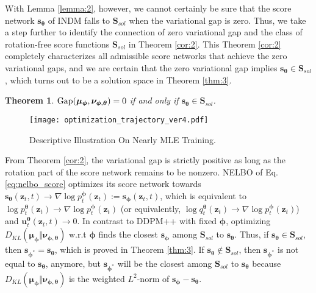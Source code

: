 \documentclass{article}
\newtheorem{theorem}{Theorem}\newtheorem{proposition}{Proposition}
\theoremstyle{definition}
\theoremstyle{remark}
\begin{document}
	With Lemma \ref{lemma:2}, however, we cannot certainly be sure that the score network $\mathbf{s}_{\bm{\theta}}$ of INDM falls to $\mathbf{S}_{sol}$ when the variational gap is zero. Thus, we take a step further to identify the connection of zero variational gap and the class of rotation-free score functions $\mathbf{S}_{sol}$ in Theorem \ref{cor:2}. This Theorem \ref{cor:2} completely characterizes all admissible score networks that achieve the zero variational gaps, and we are certain that the zero variational gap implies $\mathbf{s}_{\bm{\theta}}\in\mathbf{S}_{sol}$, which turns out to be a solution space in Theorem \ref{thm:3}.
	\begingroup
	\renewcommand\thetheorem{2}
	\begin{theorem}
		$\textup{Gap}(\bm{\mu}_{\bm{\phi}},\bm{\nu}_{\bm{\phi},\bm{\theta}})=0$ if and only if $\mathbf{s}_{\bm{\theta}}\in\mathbf{S}_{sol}$. 
	\end{theorem}
	\endgroup
	
	\begin{wrapfigure}{r}{0.6\textwidth}
		\vskip -0.25in
		\centering
		\texttt{[image: optimization\_trajectory\_ver4.pdf]}
		\vskip -0.05in
		\caption{Descriptive Illustration On Nearly MLE Training.}
		\label{fig:training_curve}
		\vskip -0.1in
	\end{wrapfigure}
	From Theorem \ref{cor:2}, the variational gap is strictly positive as long as the rotation part of the score network remains to be nonzero. NELBO of Eq. \eqref{eq:nelbo_score} optimizes its score network towards $\mathbf{s}_{\bm{\theta}}(\mathbf{z}_{t},t)\rightarrow\nabla\log{p_{t}^{\bm{\phi}}(\mathbf{z}_{t})}:=\mathbf{s}_{\bm{\phi}}(\mathbf{z}_{t},t)$, which is equivalent to $\log{p_{t}^{\bm{\theta}}(\mathbf{z}_{t})}\rightarrow\nabla\log{p_{t}^{\bm{\phi}}(\mathbf{z}_{t})}$ (or equivalently, $\log{q_{t}^{\bm{\theta}}(\mathbf{z}_{t})}\rightarrow\nabla\log{p_{t}^{\bm{\phi}}(\mathbf{z}_{t})}$) and $\mathbf{u}_{t}^{\bm{\theta}}(\mathbf{z}_{t},t)\rightarrow 0$. In contrast to DDPM++ with fixed $\bm{\phi}$, optimizing $D_{KL}(\bm{\mu}_{\bm{\phi}}\Vert\bm{\nu}_{\bm{\phi},\bm{\theta}})$ w.r.t $\bm{\phi}$ finds the closest $\mathbf{s}_{\bm{\phi}}$ among $\mathbf{S}_{sol}$ to $\mathbf{s}_{\bm{\theta}}$. Thus, if $\mathbf{s}_{\bm{\theta}}\in\mathbf{S}_{sol}$, then $\mathbf{s}_{\bm{\phi}^{*}}=\mathbf{s}_{\bm{\theta}}$, which is proved in Theorem \ref{thm:3}. If $\mathbf{s}_{\bm{\theta}}\notin\mathbf{S}_{sol}$, then $\mathbf{s}_{\bm{\phi}^{*}}$ is not equal to $\mathbf{s}_{\bm{\theta}}$, anymore, but $\mathbf{s}_{\bm{\phi}^{*}}$ will be the closest among $\mathbf{S}_{sol}$ to $\mathbf{s}_{\bm{\theta}}$ because $D_{KL}(\bm{\mu}_{\bm{\phi}}\Vert\bm{\nu}_{\bm{\phi},\bm{\theta}})$ is the weighted $L^{2}$-norm of $\mathbf{s}_{\bm{\phi}}-\mathbf{s}_{\bm{\theta}}$. 
	
\end{document}
